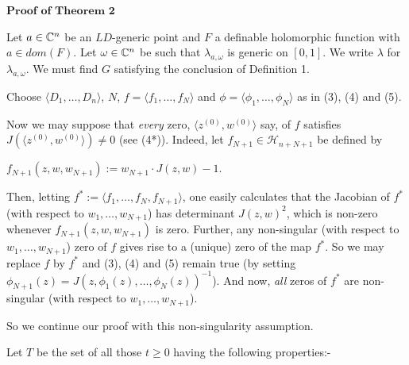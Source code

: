 \documentclass[12pt,nodate]{article}
\begin{document}
\vspace{3mm} 
 
 
 
 
 
 
 \noindent
 $\mathbf{Proof}$ $\mathbf{of}$ $\mathbf{Theorem}$ $\mathbf{2}$
 
 \vspace{1mm}
 
 Let $a \in \mathbb{C}^{n}$ be an $LD$-generic point and $F$ a definable holomorphic function with $a \in dom(F)$. Let $\omega \in \mathbb{C}^{n}$ be such that $\lambda_{a, \omega}$ is generic on $[0, 1]$. We write $\lambda$ for 
 $\lambda_{a, \omega}$. We must find $G$ satisfying the conclusion of Definition 1.
 
 Choose $\langle D_1 , \ldots , D_n \rangle$, $N$, $f = \langle f_1 , \ldots , f_N \rangle$ and $\phi = \langle \phi_1 , \ldots , \phi_N \rangle$ as in (3), (4) and (5).
 
 Now we may suppose that \emph{every} zero, $\langle z^{(0)}, w^{(0)} \rangle$ say, of $f$ satisfies \\ $J(\langle z^{(0)}, w^{(0)} \rangle ) \neq 0$ (see (4*)). Indeed, let $f_{N+1} \in \mathcal{H}_{n+N+1}$ be defined by
 
 \vspace{3mm} 
 
 \hspace{25mm} $f_{N+1}(z, w, w_{N+1}) := w_{N+1} \cdot J(z, w) - 1$.
 
 \vspace{3mm}
 
 \noindent
 Then, letting $f^* := \langle f_1 , \ldots , f_N , f_{N+1} \rangle$, one easily calculates that the Jacobian of $f^*$ (with respect to $w_1 , \ldots , w_{N+1}$) has determinant $J(z, w)^2$, which is non-zero whenever $f_{N+1} (z, w, w_{N+1})$ is zero. Further, any non-singular (with respect to $w_1 , \ldots , w_{N+1}$) zero of $f$ gives rise to a (unique) zero of the map $f^*$. So we may replace $f$ by $f^*$ and (3), (4) and (5) remain true (by setting $\phi_{N+1}(z)  = J(z, \phi_1 (z), \ldots , \phi_N (z))^{-1}$). And now, \emph{all} zeros of $f^*$ are non-singular (with respect to $w_1 , \ldots , w_{N+1}$).
 
 So we continue our proof with this non-singularity assumption.
 
 \vspace{2mm}
 
 Let $T$ be the set of all those $t \geq 0$ having the following properties:-
 
 \vspace{2mm}
 
\end{document}
